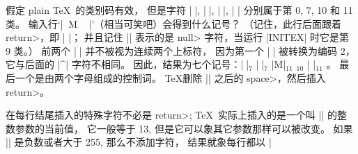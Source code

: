 {%
\ddangerexercise 假定 plain \TeX\ 的类别码有效，
但是字符 |^^A|, |^^B|, |^^C|, |^^M| 分别属于第 0, 7, 10 和 11 类。%
输入行`|^^B^^BM^^A^^B^^C^^M^^@\M|\]'（相当可笑吧）会得到什么记号？
（记住，此行后面跟着 \<return>，即 |^^M|；
并且记住 |^^@| 表示的是 \<null> 字符，当运行 |INITEX| 时它是第 9 类。）
\answer 前两个 |^^B| 并不被视为连续两个上标符，
因为第一个 |^^B| 被转换为编码 2，它与后面的 |^| 字符不相同。
因此，结果为七个记号：|^^B|$_7$ |^^B|$_7$
|M|$_{11}$  \]$_{10}$ |^^M|$_{11}$ 。
最后一个是由两个字母组成的控制词。
\TeX 删除 |\M| 之后的 \<space>，然后插入 \<return>。

\ddanger 在每行结尾插入的特殊字符不必是 \<return>;
\TeX\ 实际上插入的是一个叫 |\endlinechar| 的整数参数的当前值，
它一般等于 13, 但是它可以象其它参数那样可以被改变。
如果 |\endlinechar| 是负数或者大于 255, 那么不添加字符，
结果就象每行都以 |%

}
